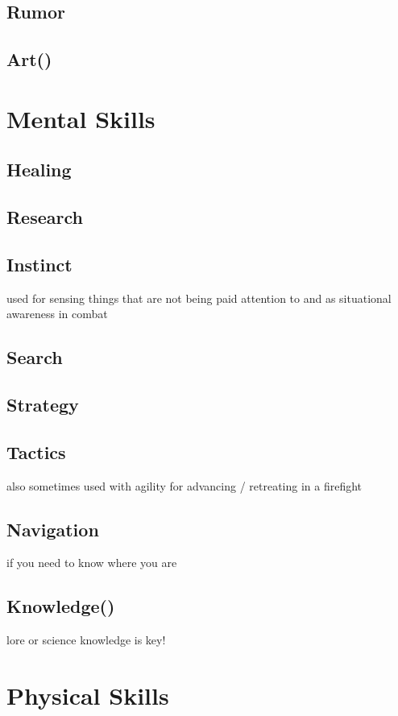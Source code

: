 \subsection{Rumor}\label{subsec:rumor}
\subsection{Art()}\label{subsec:art}

\section{Mental Skills}\label{sec:wisdom-skills}
\subsection{Healing}\label{subsec:healing-skill}
\subsection{Research}\label{subsec:research}
\subsection{Instinct}\label{subsec:instinct}
used for sensing things that are not being paid attention to and as situational awareness in combat
\subsection{Search}\label{subsec:search}
\subsection{Strategy}\label{subsec:strategy}
\subsection{Tactics}\label{subsec:tactics}
also sometimes used with agility for advancing / retreating in a firefight
\subsection{Navigation}\label{subsec:navigation}
if you need to know where you are
\subsection{Knowledge()}\label{subsec:knowledge}
lore or science knowledge is key!


\section{Physical Skills}\label{sec:strength-skills}
